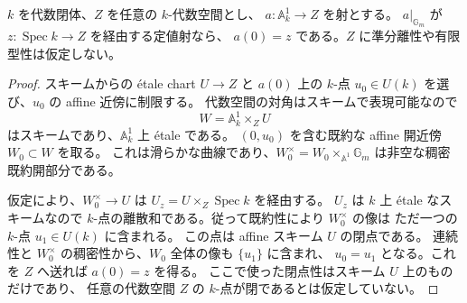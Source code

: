 \begin{lemma}[定値な穿孔直線の特殊化]
\label{lem:constant-punctured-line-space}
$k$ を代数閉体、$Z$ を任意の $k$-代数空間とし、
$a:\mathbb A^1_k\to Z$ を射とする。
$a|_{\mathbb G_m}$ が $z:\operatorname{Spec}k\to Z$ を経由する定値射なら、
$a(0)=z$ である。$Z$ に準分離性や有限型性は仮定しない。
\end{lemma}
\begin{proof}
スキームからの \texorpdfstring{\'etale}{etale} chart $U\to Z$ と
$a(0)$ 上の $k$-点 $u_0\in U(k)$ を選び、$u_0$ の affine 近傍に制限する。
代数空間の対角はスキームで表現可能なので
\[
 W=\mathbb A^1_k\times_Z U
\]
はスキームであり、$\mathbb A^1_k$ 上 \texorpdfstring{\'etale}{etale} である。
$(0,u_0)$ を含む既約な affine 開近傍 $W_0\subset W$ を取る。
これは滑らかな曲線であり、$W_0^\times=W_0\times_{\mathbb A^1}\mathbb G_m$
は非空な稠密既約開部分である。

仮定により、$W_0^\times\to U$ は
$U_z=U\times_Z\operatorname{Spec}k$ を経由する。
$U_z$ は $k$ 上 \texorpdfstring{\'etale}{etale} なスキームなので
$k$-点の離散和である。従って既約性により $W_0^\times$ の像は
ただ一つの $k$-点 $u_1\in U(k)$ に含まれる。
この点は affine スキーム $U$ の閉点である。
連続性と $W_0^\times$ の稠密性から、$W_0$ 全体の像も $\{u_1\}$ に含まれ、
$u_0=u_1$ となる。これを $Z$ へ送れば $a(0)=z$ を得る。
ここで使った閉点性はスキーム $U$ 上のものだけであり、
任意の代数空間 $Z$ の $k$-点が閉であるとは仮定していない。
\end{proof}


